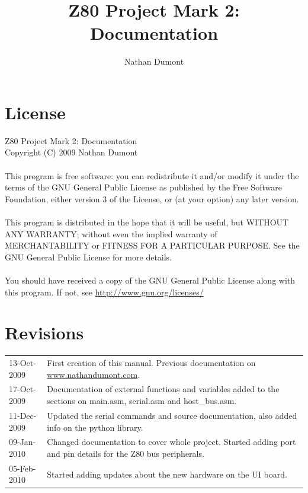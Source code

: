 \documentclass[a4paper,10pt]{book}
\title{Z80 Project Mark 2: Documentation}
\author{Nathan Dumont}
\begin{document}
\maketitle

\tableofcontents

\newpage
\section{License}
Z80 Project Mark 2: Documentation\\
Copyright (C) 2009 Nathan Dumont
\\\\
This program is free software: you can redistribute it and/or 
modify it under the terms of the GNU General Public License as 
published by the Free Software Foundation, either version 3 of 
the License, or (at your option) any later version.
\\\\
This program is distributed in the hope that it will be useful,
but WITHOUT ANY WARRANTY; without even the implied warranty of
MERCHANTABILITY or FITNESS FOR A PARTICULAR PURPOSE.  See the
GNU General Public License for more details.
\\\\
You should have received a copy of the GNU General Public License
along with this program.  
If not, see \href{http://www.gnu.org/licenses/}{http://www.gnu.org/licenses/}

\section{Revisions}
\begin{tabular}{lp{9cm}}
 13-Oct-2009&First creation of this manual.  Previous documentation on \href{http://www.nathandumont.com/node/215}{www.nathandumont.com}.\\
 17-Oct-2009&Documentation of external functions and variables added to the sections on main.asm, serial.asm and host\_bus.asm.\\ 
 11-Dec-2009&Updated the serial commands and source documentation, also added info on the python library.\\
 09-Jan-2010&Changed documentation to cover whole project.  Started adding port and pin details for the Z80 bus peripherals.\\
 05-Feb-2010&Started adding updates about the new hardware on the UI board.\\
\end{tabular}
\end{document}
